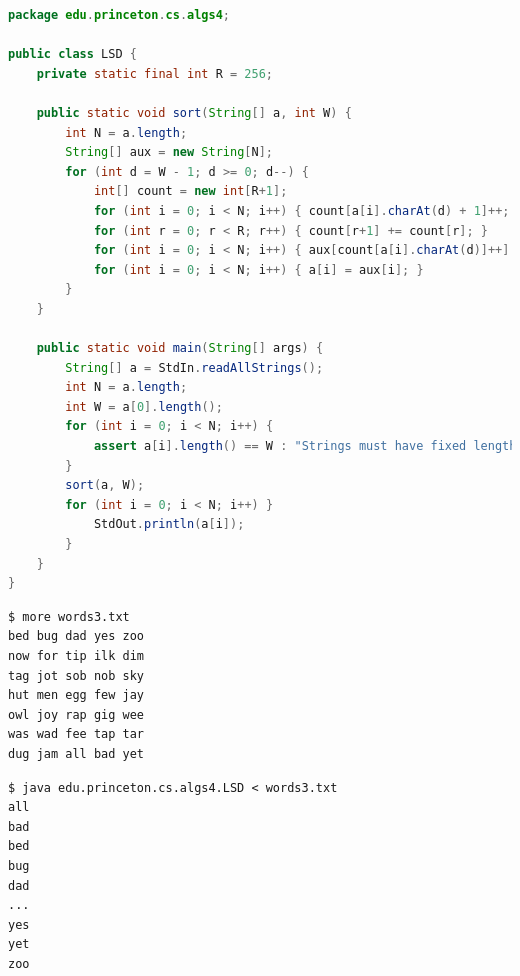 \documentclass[8pt,a4paper,compress]{beamer}
\begin{document}
\begin{frame}[fragile]
\pause

\begin{lstlisting}[language=Java]
package edu.princeton.cs.algs4;

public class LSD {
    private static final int R = 256; 

    public static void sort(String[] a, int W) {
        int N = a.length;
        String[] aux = new String[N];
        for (int d = W - 1; d >= 0; d--) {
            int[] count = new int[R+1];
            for (int i = 0; i < N; i++) { count[a[i].charAt(d) + 1]++; }
            for (int r = 0; r < R; r++) { count[r+1] += count[r]; }
            for (int i = 0; i < N; i++) { aux[count[a[i].charAt(d)]++] = a[i]; }
            for (int i = 0; i < N; i++) { a[i] = aux[i]; }
        }
    }

    public static void main(String[] args) {
        String[] a = StdIn.readAllStrings();
        int N = a.length;
        int W = a[0].length();
        for (int i = 0; i < N; i++) {
            assert a[i].length() == W : "Strings must have fixed length";
        }
        sort(a, W);
        for (int i = 0; i < N; i++) }
            StdOut.println(a[i]);
        }
    }
}
\end{lstlisting}
\end{frame}

\begin{frame}[fragile]
\pause

\begin{lstlisting}[language={}]
$ more words3.txt
bed bug dad yes zoo
now for tip ilk dim 
tag jot sob nob sky
hut men egg few jay
owl joy rap gig wee
was wad fee tap tar
dug jam all bad yet
\end{lstlisting}

\pause

\begin{lstlisting}[language={}]
$ java edu.princeton.cs.algs4.LSD < words3.txt 
all
bad
bed
bug
dad
...
yes
yet
zoo
\end{lstlisting}
\end{frame}
\end{document}
